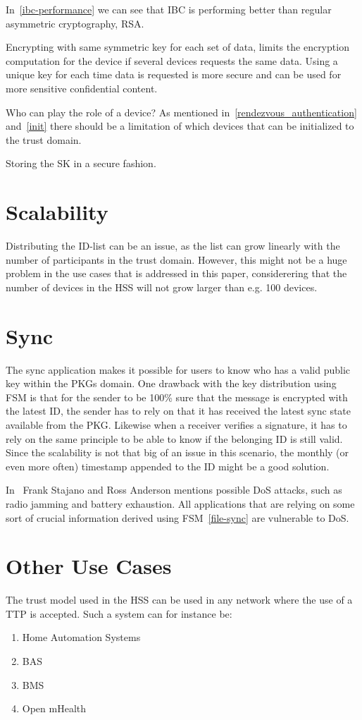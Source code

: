 In~\autoref{ibc-performance} we can see that \gls{IBC} is performing better than regular asymmetric cryptography, RSA. 

Encrypting with same symmetric key for each set of data, limits the encryption computation for the device if several devices requests the same data.
Using a unique key for each time data is requested is more secure and can be used for more sensitive confidential content.

Who can play the role of a device?
As mentioned in~\autoref{rendezvous_authentication} and~\autoref{init} there should be a limitation of which devices that can be initialized to the trust domain.

Storing the \gls{SK} in a secure fashion.

\section{Scalability}
Distributing the \gls{ID}-list can be an issue, as the list can grow linearly with the number of participants in the trust domain.
However, this might not be a huge problem in the use cases that is addressed in this paper, considerering that the number of devices in the \gls{HSS} will not grow larger than e.g. 100 devices. 

\section{Sync}
The sync application makes it possible for users to know who has a valid public key within the \gls{PKG}s domain.
One drawback with the key distribution using \gls{FSM} is that for the sender to be 100\% sure that the message is encrypted with the latest \gls{ID}, the sender has to rely on that it has received the latest sync state available from the \gls{PKG}.
Likewise when a receiver verifies a signature, it has to rely on the same principle to be able to know if the belonging \gls{ID} is still valid.
Since the scalability is not that big of an issue in this scenario, the monthly (or even more often) timestamp appended to the \gls{ID} might be a good solution.

In~\cite{DBLP:conf/spw/StajanoA99} Frank Stajano and Ross Anderson mentions possible \gls{DoS} attacks, such as radio jamming and battery exhaustion. 
All applications that are relying on some sort of crucial information derived using \gls{FSM}~\autoref{file-sync} are vulnerable to \gls{DoS}.

\section{Other Use Cases}
The trust model used in the \gls{HSS} can be used in any network where the use of a \gls{TTP} is accepted. 
Such a system can for instance be:
\begin{enumerate}
	\item Home Automation Systems
	\item \gls{BAS}
	\item \gls{BMS}
	\item Open mHealth
\end{enumerate}


